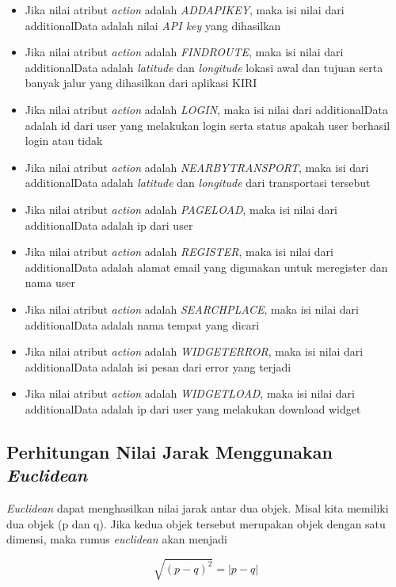 \begin{itemize}
	\item Jika nilai atribut \textsl{action} adalah \textsl{ADDAPIKEY}, maka isi nilai dari additionalData adalah nilai \textsl{API key} yang dihasilkan
	\item Jika nilai atribut \textsl{action} adalah \textsl{FINDROUTE}, maka isi nilai dari additionalData adalah \textsl{latitude} dan \textsl{longitude} lokasi awal dan tujuan serta banyak jalur yang dihasilkan dari aplikasi KIRI
	\item Jika nilai atribut \textsl{action} adalah \textsl{LOGIN}, maka isi nilai dari additionalData adalah id dari user yang melakukan login serta status apakah user berhasil login atau tidak
	\item Jika nilai atribut \textsl{action} adalah \textsl{NEARBYTRANSPORT}, maka isi dari additionalData adalah \textsl{latitude} dan \textsl{longitude} dari transportasi tersebut
	\item Jika nilai atribut \textsl{action} adalah \textsl{PAGELOAD}, maka isi nilai dari additionalData adalah ip dari user
	\item Jika nilai atribut \textsl{action} adalah \textsl{REGISTER}, maka isi nilai dari additionalData adalah alamat email yang digunakan untuk meregister dan nama user
	\item Jika nilai atribut \textsl{action} adalah \textsl{SEARCHPLACE}, maka isi nilai dari additionalData adalah nama tempat yang dicari
	\item Jika nilai atribut \textsl{action} adalah \textsl{WIDGETERROR}, maka isi nilai dari additionalData adalah isi pesan dari error yang terjadi
	\item Jika nilai atribut \textsl{action} adalah \textsl{WIDGETLOAD}, maka isi nilai dari additionalData adalah ip dari user yang melakukan download widget
\end{itemize}

\subsection{Perhitungan Nilai Jarak Menggunakan \textsl{Euclidean}}
\textsl{Euclidean} dapat menghasilkan nilai jarak antar dua objek. Misal kita memiliki dua objek (p dan q). Jika kedua objek tersebut merupakan objek dengan satu dimensi, maka rumus \textsl{euclidean} akan menjadi

\begin{displaymath}
	\sqrt{(p - q)^{2}} = |p - q|
\end{displaymath} 

